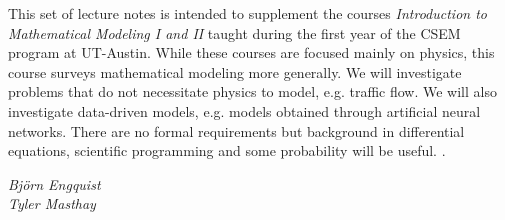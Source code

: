 %
%

\preface

This set of lecture notes is intended to supplement the courses \textit{Introduction to Mathematical Modeling I and II} taught during the first year of the CSEM program at UT-Austin. While these courses are focused mainly on physics, this course surveys mathematical modeling more generally. We will investigate problems that do not necessitate physics to model, e.g. traffic flow. We will also investigate data-driven models, e.g. models obtained through artificial neural networks. There are no formal requirements but background in differential equations, scientific programming and some probability will be useful. .
 

\vspace{\baselineskip}
\begin{flushright}\noindent
\hfill {\it Bj\"{o}rn Engquist}\\
\hfill {\it Tyler Masthay}\\
\end{flushright}



